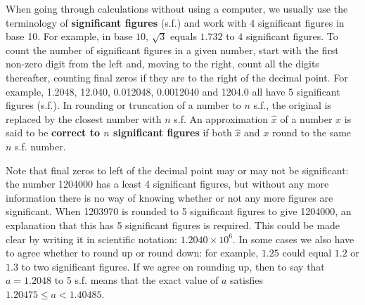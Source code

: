 When going through calculations without using a computer, we usually use the terminology 
of \textbf{significant figures} (s.f.) and work with $4$ significant figures in base 10. 
For example, in base $10$, $\sqrt{3}$ equals $1.732$ to $4$ significant figures. 
To count the number of significant figures in a given number, start with the first
non-zero digit from the left and, moving to the right, count all the
digits thereafter, counting final zeros if they are to the right of
the decimal point. For example, 1.2048, 12.040, 0.012048, 0.0012040
and 1204.0 all have 5 significant figures (s.f.). In rounding or truncation
of a number to $n$ s.f., the original is replaced by the closest number with $n$ s.f.
An approximation $\hat{x}$ of a number $x$ is said to be \textbf{correct to $n$ significant figures} if both $\hat{x}$ and $x$ round to the same $n$ s.f. number.

\begin{remark}
Note that final zeros to left of the decimal point may or may not be
significant: the number 1204000 has a least 4 significant figures, but
without any more information there is no way of knowing whether or not
any more figures are significant. When 1203970 is rounded to 5
significant figures to give 1204000, an explanation that this has 5
significant figures is required. This could be made clear by writing it
in scientific notation: $1.2040\times 10^6$. In some cases we also have to agree whether to round
up or round down: for example, $1.25$ could equal $1.2$ or $1.3$ to two significant figures.
If we agree on rounding up, then to say that $a=1.2048$ to 5 s.f. means that the exact
value of $a$ satisfies $1.20475\le a< 1.40485$.
\end{remark}

